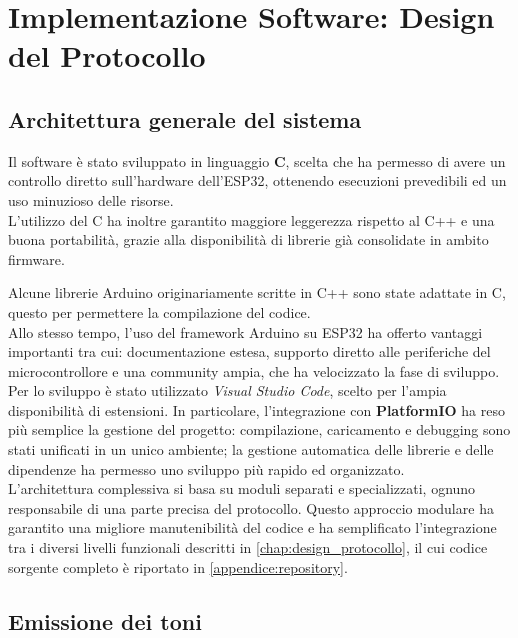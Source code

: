 \chapter{Implementazione Software: Design del Protocollo}
\label{chap:implementazione_software}

\section{Architettura generale del sistema}

Il software è stato sviluppato in linguaggio \textbf{C}, scelta che ha permesso di avere un controllo diretto sull’hardware dell’ESP32,
ottenendo esecuzioni prevedibili ed un uso minuzioso delle risorse. \\
L’utilizzo del C ha inoltre garantito maggiore leggerezza rispetto al C++ e una buona portabilità, grazie alla disponibilità di librerie 
già consolidate in ambito firmware.  

Alcune librerie Arduino originariamente scritte in C++ sono state adattate in C, questo per permettere la compilazione del codice.\\
Allo stesso tempo, l’uso del framework Arduino su 
ESP32 ha offerto vantaggi importanti tra cui: documentazione estesa, supporto diretto alle periferiche del microcontrollore e una 
community ampia, che ha velocizzato la fase di sviluppo. \\

Per lo sviluppo è stato utilizzato \textit{Visual Studio Code}, scelto per l’ampia disponibilità di estensioni.
In particolare, l’integrazione con \textbf{PlatformIO} ha reso più semplice la gestione del progetto: compilazione, caricamento e debugging sono stati 
unificati in un unico ambiente; la gestione automatica delle librerie e delle dipendenze ha permesso uno sviluppo più rapido ed organizzato.\\ 

L’architettura complessiva si basa su moduli separati e specializzati, ognuno responsabile di una parte precisa del protocollo. 
Questo approccio modulare ha garantito una migliore manutenibilità del codice e ha semplificato l’integrazione tra i diversi livelli funzionali 
descritti in \autoref{chap:design_protocollo}, il cui codice sorgente completo è riportato in \autoref{appendice:repository}.\\


\section{Emissione dei toni}

